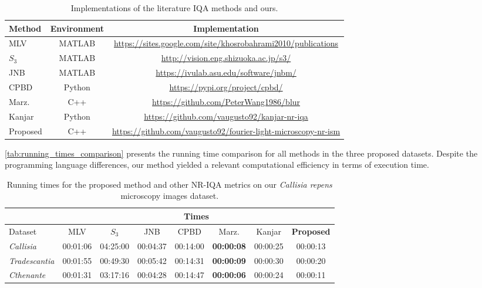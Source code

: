 \begin{table}[htbp]
    \caption{Implementations of the literature IQA methods and ours.}
    \label{tab:implementations}
    \begin{center}
    \begin{tabular}{lcc}
        \toprule
        \textbf{Method} & \textbf{Environment} & \textbf{Implementation}\\
        \midrule
        MLV & MATLAB & \url{https://sites.google.com/site/khosrobahrami2010/publications}\\
        $S_{3}$ & MATLAB & \url{http://vision.eng.shizuoka.ac.jp/s3/}\\
        JNB & MATLAB & \url{https://ivulab.asu.edu/software/jnbm/}\\
        CPBD & Python & \url{https://pypi.org/project/cpbd/}\\
        Marz. & C++ & \url{https://github.com/PeterWang1986/blur}\\
        Kanjar & Python & \url{https://github.com/vaugusto92/kanjar-nr-iqa}\\
        Proposed & C++ & \url{https://github.com/vaugusto92/fourier-light-microscopy-nr-ism}\\
        \bottomrule
    \end{tabular}
\end{center}
\end{table}


\autoref{tab:running_times_comparison} presents the running time comparison for all methods in the three proposed datasets. Despite the programming language differences, our method yielded a relevant computational efficiency in terms of execution time. 

\begin{table}[ht]
    \centering
    \caption{Running times for the proposed method and other NR-IQA metrics on our \emph{Callisia repens} microscopy images dataset.}
    \label{tab:running_times_comparison}
    \begin{tabular}{lccccccc}
        \toprule
        & \multicolumn{7}{c}{Times} \\
        \midrule
        Dataset & MLV & $S_{3}$ & JNB & CPBD & Marz. & Kanjar & \textbf{Proposed}\\
        \midrule
        
        \textit{Callisia} & 00:01:06 & 04:25:00 & 00:04:37 & 00:14:00 & \textbf{00:00:08} & 00:00:25 & 00:00:13\\
        \textit{Tradescantia} & 00:01:55 & 00:49:30 & 00:05:42 & 00:14:31 & \textbf{00:00:09} & 00:00:30 & 00:00:20\\
        \textit{Cthenante} & 00:01:31 & 03:17:16 & 00:04:28 & 00:14:47 & \textbf{00:00:06} & 00:00:24 & 00:00:11\\
        
        \bottomrule
    \end{tabular}
    \centering
    \fautor
\end{table}